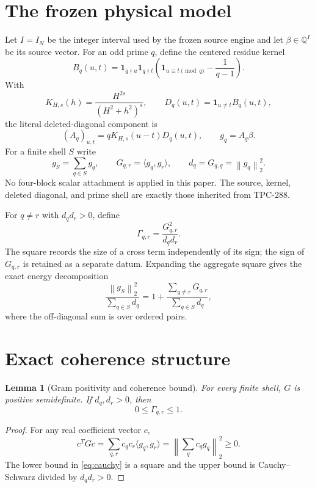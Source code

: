 \documentclass[10pt]{article}
\newtheorem{lemma}{Lemma}
\newcommand{\QQ}{\mathbb Q}
\newcommand{\norm}[1]{\left\lVert #1\right\rVert}
\begin{document}
\section{The frozen physical model}

Let $I=I_N$ be the integer interval used by the frozen source engine and let
$\beta\in\QQ^I$ be its source vector.  For an odd prime $q$, define the
centered residue kernel
\[
 B_q(u,t)=\mathbf 1_{q\nmid u}\mathbf 1_{q\nmid t}
 \left(\mathbf 1_{u\equiv t\pmod q}-\frac{1}{q-1}\right).
\]
With
\[
 K_{H,s}(h)=\frac{H^{2s}}{(H^2+h^2)^s},
 \qquad
 D_q(u,t)=\mathbf 1_{u\ne t}B_q(u,t),
\]
the literal deleted-diagonal component is
\[
 (A_q)_{u,t}=qK_{H,s}(u-t)D_q(u,t),
 \qquad g_q=A_q\beta.
\]
For a finite shell $S$ write
\[
 g_S=\sum_{q\in S}g_q,\qquad
 G_{q,r}=\langle g_q,g_r\rangle,\qquad d_q=G_{q,q}=\norm{g_q}_2^2.
\]
No four-block scalar attachment is applied in this paper.  The source, kernel,
deleted diagonal, and prime shell are exactly those inherited from TPC-288.

For $q\ne r$ with $d_qd_r>0$, define
\[
 \Gamma_{q,r}=\frac{G_{q,r}^2}{d_qd_r}.
\]
The square records the size of a cross term independently of its sign; the
sign of $G_{q,r}$ is retained as a separate datum.  Expanding the aggregate
square gives the exact energy decomposition
\begin{equation}
 \frac{\norm{g_S}_2^2}{\sum_{q\in S}d_q}
 =1+\frac{\sum_{q\ne r}G_{q,r}}{\sum_{q\in S}d_q},
 \label{eq:energy}
\end{equation}
where the off-diagonal sum is over ordered pairs.

\section{Exact coherence structure}

\begin{lemma}[Gram positivity and coherence bound]
For every finite shell, $G$ is positive semidefinite.  If $d_q,d_r>0$, then
\begin{equation}
 0\leq \Gamma_{q,r}\leq 1.
 \label{eq:cauchy}
\end{equation}
\end{lemma}

\begin{proof}
For any real coefficient vector $c$,
\[
 c^T Gc=\sum_{q,r}c_qc_r\langle g_q,g_r\rangle
 =\norm{\sum_qc_qg_q}_2^2\geq0.
\]
The lower bound in \eqref{eq:cauchy} is a square and the upper bound is
Cauchy--Schwarz divided by $d_qd_r>0$.
\end{proof}
\end{document}
